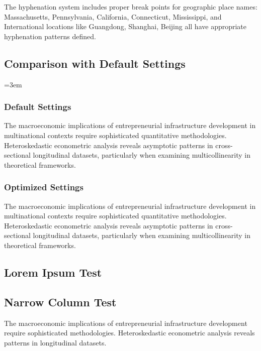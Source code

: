 \documentclass[11pt,a4paper]{article}
\begin{document}
The hyphenation system includes proper break points for geographic place names: Massachusetts, Pennsylvania, California, Connecticut, Mississippi, and International locations like Guangdong, Shanghai, Beijing all have appropriate hyphenation patterns defined.

\subsection{Comparison with Default Settings}

\begingroup
\emergencystretch=3em
\spaceskip=0pt
\xspaceskip=0pt

\subsubsection{Default Settings}
The macroeconomic implications of entrepreneurial infrastructure development in multinational contexts require sophisticated quantitative methodologies. Heteroskedastic econometric analysis reveals asymptotic patterns in cross-sectional longitudinal datasets, particularly when examining multicollinearity in theoretical frameworks.

\endgroup

\subsubsection{Optimized Settings}
The macroeconomic implications of entrepreneurial infrastructure development in multinational contexts require sophisticated quantitative methodologies. Heteroskedastic econometric analysis reveals asymptotic patterns in cross-sectional longitudinal datasets, particularly when examining multicollinearity in theoretical frameworks.

\subsection{Lorem Ipsum Test}

\lipsum[1-2]

\subsection{Narrow Column Test}

\begin{minipage}{0.45\textwidth}
The macroeconomic implications of entrepreneurial infrastructure development require sophisticated methodologies. Heteroskedastic econometric analysis reveals patterns in longitudinal datasets.
\end{minipage}
\end{document}
